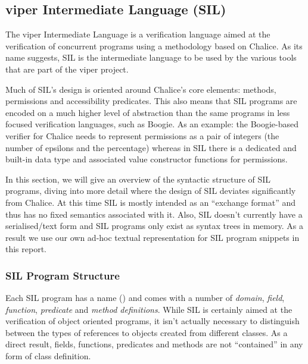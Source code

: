 
\subsection{viper Intermediate Language (SIL)}\label{sct:sil}
The viper Intermediate Language is a verification language aimed at the verification of concurrent programs using a methodology based on Chalice.
As its name suggests, SIL is the intermediate language to be used by the various tools that are part of the viper project.

Much of SIL's design is oriented around Chalice's core elements: methods, permissions and accessibility predicates. 
This also means that SIL programs are encoded on a much higher level of abstraction than the same programs in less focused verification languages, such as Boogie.
As an example: the Boogie-based verifier for Chalice needs to represent permissions as a pair of integers (the number of epsilons and the percentage) whereas in SIL there is a dedicated and built-in data type and associated value constructor functions for permissions.

In this section, we will give an overview of the syntactic structure of SIL programs, diving into more detail where the design of SIL deviates significantly from Chalice.
At this time SIL is mostly intended as an ``exchange format'' and thus has no fixed semantics associated with it.
Also, SIL doesn't currently have a serialised/text form and SIL programs only exist as syntax trees in memory.
As a result we use our own ad-hoc textual representation for SIL program snippets in this report.


%

\subsubsection{SIL Program Structure}
Each SIL program has a name () and comes with a number of \emph{domain}, \emph{field}, \emph{function}, \emph{predicate} and \emph{method definitions}.
While SIL is certainly aimed at the verification of object oriented programs, it isn't actually necessary to distinguish between the types of references to objects created from different classes.
As a direct result, fields, functions, predicates and methods are not ``contained'' in any form of class definition.

